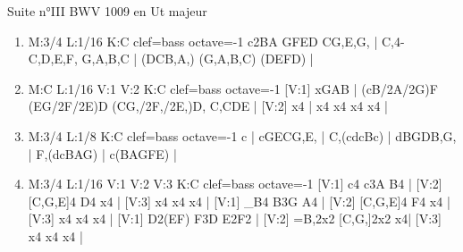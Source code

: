 \documentclass[a4paper,twoside]{article}
\begin{document}
\begin{center}
\Large Suite n°III BWV 1009 en Ut majeur
\end{center}

\vspace{3cm}

%
%
\large
\settowidth{\titlelen}{Allemande}
\addtolength{\titlelen}{0.5em}
\setlength{\titleseplen}{1cm}
\begin{enumerate}
  \item {}
\begin{abcsvg}
  M:3/4
  L:1/16
  K:C clef=bass octave=-1
  c2BA GFED CG,E,G, |
  C,4- C,D,E,F, G,A,B,C |
  (DCB,A,) (G,A,B,C) (DEFD) |
\end{abcsvg}
\makebox[2cm][l]{ \dotfill\ \pageref{IIIprelude}}
\par\vspace{\titleseplen}

  \item {}
\begin{abcsvg}
  M:C
  L:1/16
  V:1
  V:2
  K:C clef=bass octave=-1
  [V:1] xGAB | (cB/2A/2G)F (EG/2F/2E)D (CG,/2F,/2E,)D, C,CDE |
  [V:2] x4   |  x4          x4          x4             x4    |
\end{abcsvg}
\makebox[2cm][l]{ \dotfill\ \pageref{IIIallemande}}
\par\vspace{\titleseplen}

  \item {}
\begin{abcsvg}
  M:3/4
  L:1/8
  K:C clef=bass octave=-1
  c | cGECG,E, |
  C,(cdcBc) |
  dBGDB,G, |
  F,(dcBAG) |
  c(BAGFE) |
\end{abcsvg}
\makebox[2cm][l]{ \dotfill\ \pageref{IIIcourante}}
\par\vspace{\titleseplen}

  \item {}
\begin{abcsvg}
  M:3/4
  L:1/16
  V:1
  V:2
  V:3
  K:C clef=bass octave=-1
  [V:1] c4 c3A B4 |
  [V:2] [C,G,E]4 D4 x4 |
  [V:3] x4 x4 x4 |
  [V:1] _B4 B3G A4 |
  [V:2] [C,G,E]4 F4 x4 |
  [V:3] x4 x4 x4 |
  [V:1] D2(EF) F3D E2F2 |
  [V:2] =B,2x2 [C,G,]2x2 x4|
  [V:3] x4 x4 x4 |
\end{abcsvg}
\makebox[2cm][l]{ \dotfill\ \pageref{IIIsarabande}}
\par\vspace{\titleseplen}


\end{enumerate}
\end{document}
